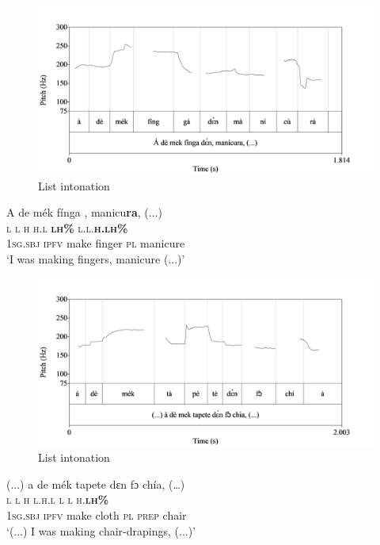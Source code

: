 \begin{figure}
\caption{List intonation}
\label{fig:key:3.36}
\includegraphics[height=.3\textheight]{figures/yakpomod-img38.png}
\end{figure}

  
 


\ea%
    \label{ex:key:89}
    \glll   A    de  mék    fínga  ,    manicu\textbf{ra},  (...)\\
\textsc{l}    \textsc{l}  \textsc{h}    \textsc{h.l}    \textbf{\textsc{lh\%}}    \textsc{l.l.}\textbf{\textsc{h.lh\%}}\\
\textsc{1sg.sbj}  \textsc{ipfv}  make  finger  \textsc{pl}    manicure\\
\glt ‘I was making fingers, manicure (...)’
\z

\begin{figure}
\caption{List intonation}
\label{fig:key:3.37}
\includegraphics[height=.3\textheight]{figures/yakpomod-img39.png}
\end{figure}
 


\ea%
    \label{ex:key:90}
    \glll   (...)  a    de  mék    tapete  dɛn  fɔ  chía, (…)\\
{}  \textsc{l}    \textsc{l}  \textsc{h}    \textsc{l.h.l}    \textsc{l}  \textsc{l}  \textsc{h.}\textbf{\textsc{lh\%}}\\
{}  \textsc{1sg.sbj}  \textsc{ipfv}  make  cloth  \textsc{pl}  \textsc{prep}  chair\\
\glt ‘(...)  I was making chair-drapings, (...)’
\z

